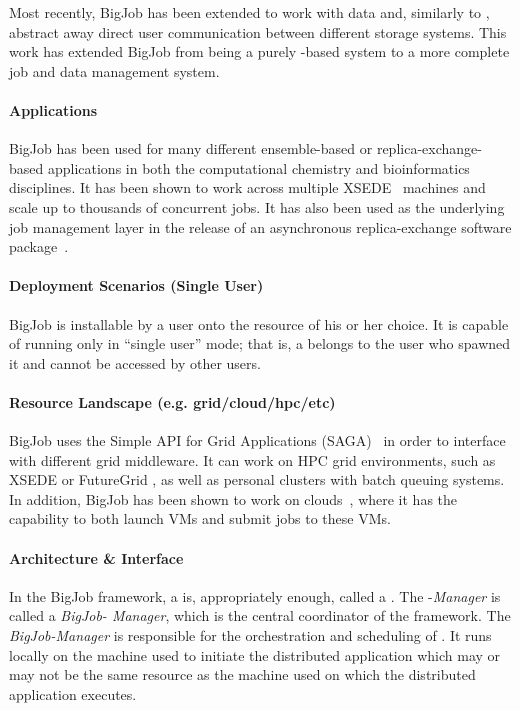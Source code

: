 \documentclass{sig-alternate}
\begin{document}
Most recently, BigJob has been extended to work with data and, similarly to
\pilotjobs, abstract away direct user communication between different
storage systems. This work has extended BigJob from being a purely
\pilotjob-based system to a more complete job and data management
system.

\paragraph{Applications}
BigJob has been used for many different ensemble-based or
replica-exchange-based applications in both the computational chemistry
and bioinformatics disciplines. It has been shown to work across multiple
XSEDE~\cite{xsede_url} machines and scale up to thousands of concurrent
jobs. It has also been used as the underlying job
management layer in the release of an asynchronous replica-exchange
software package~\cite{2013-xsede-cdi}.

\paragraph{Deployment Scenarios (Single User)}
BigJob is installable by a user onto the resource of his or her choice. It is capable of
running only in ``single user'' mode; that is, a \pilot belongs to the user who
spawned it and cannot be accessed by other users.

\paragraph{Resource Landscape (e.g. grid/cloud/hpc/etc)}
BigJob uses the Simple API for Grid Applications (SAGA)~\cite{ogf-gfd-90, sagastuff}
in order to interface with different grid middleware. It can work on HPC grid
environments, such as XSEDE or FutureGrid , as well as personal
clusters with batch queuing systems. In addition, BigJob has been shown to work
on clouds~\cite{cpe_pmr_cloud_2012}, where it has the capability to both
launch VMs and submit jobs to these VMs.

\paragraph{Architecture \& Interface}

In the BigJob framework, a \pilot is, appropriately enough, called a
\pilot. The \pilot-\textit{Manager} is called a \textit{BigJob-
Manager}, which is the central coordinator of the
framework. The \textit{BigJob-Manager} is responsible for
the orchestration and scheduling of \pilots. It runs locally on the
machine used to initiate the distributed application which may or may
not be the same resource as the machine used on which the distributed
application executes.
\end{document}
